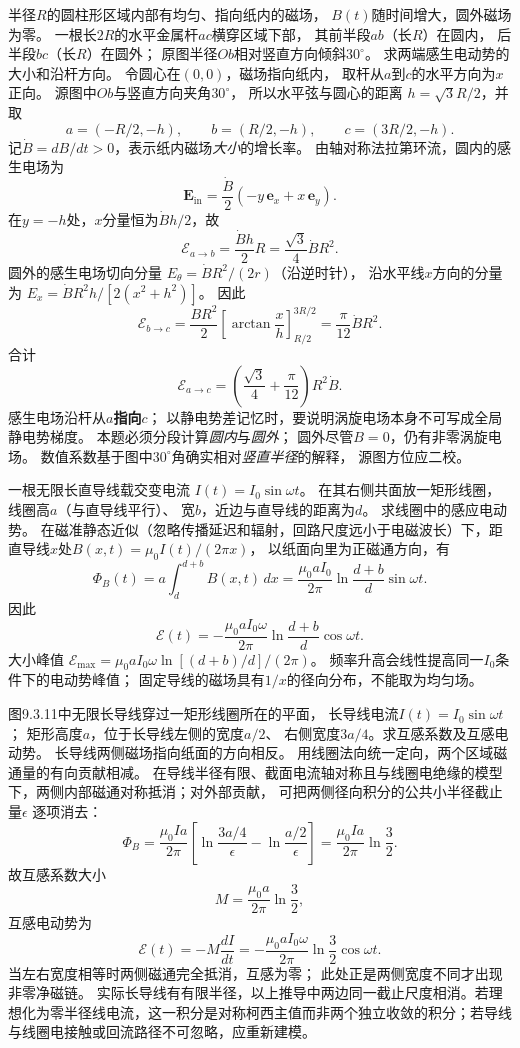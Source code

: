 \problemtext 半径$R$的圆柱形区域内部有均匀、指向纸内的磁场，
$B(t)$随时间增大，圆外磁场为零。
一根长$2R$的水平金属杆$ac$横穿区域下部，
其前半段$ab$（长$R$）在圆内，
后半段$bc$（长$R$）在圆外；
原图半径$Ob$相对竖直方向倾斜$30^\circ$。
求两端感生电动势的大小和沿杆方向。
\workings
令圆心在$(0,0)$，磁场指向纸内，
取杆从$a$到$c$的水平方向为$x$正向。
源图中$Ob$与竖直方向夹角$30^\circ$，
所以水平弦与圆心的距离
$h=\sqrt3R/2$，并取
\[
a=(-R/2,-h),\qquad b=(R/2,-h),\qquad c=(3R/2,-h).
\]
记$\dot B=dB/dt>0$，表示纸内磁场\emph{大小}的增长率。
由轴对称法拉第环流，圆内的感生电场为
\[
\bm E_{\mathrm{in}}
=\frac{\dot B}{2}(-y\,\bm e_x+x\,\bm e_y).
\]
在$y=-h$处，$x$分量恒为$\dot Bh/2$，故
\[
\mathcal E_{a\to b}
=\frac{\dot Bh}{2}R
=\frac{\sqrt3}{4}\dot BR^2.
\]
圆外的感生电场切向分量
$E_\theta=\dot BR^2/(2r)$（沿逆时针），
沿水平线$x$方向的分量为
$E_x=\dot BR^2h/[2(x^2+h^2)]$。
因此
\[
\mathcal E_{b\to c}
=\frac{\dot BR^2}{2}
\left[
\arctan\frac{x}{h}
\right]_{R/2}^{3R/2}
=\frac{\pi}{12}\dot BR^2.
\]
合计
\[
\boxed{\mathcal E_{a\to c}
=\left(\frac{\sqrt3}{4}+\frac{\pi}{12}\right)R^2\dot B}.
\]
感生电场沿杆从\textbf{$a$指向$c$}；
以静电势差记忆时，要说明涡旋电场本身不可写成全局静电势梯度。
\crosscheck 本题必须分段计算\emph{圆内}与\emph{圆外}；
圆外尽管$B=0$，仍有非零涡旋电场。
数值系数基于图中$30^\circ$角确实相对\emph{竖直半径}的解释，
源图方位应二校。

\problemtext 一根无限长直导线载交变电流
$I(t)=I_0\sin\omega t$。
在其右侧共面放一矩形线圈，线圈高$a$（与直导线平行）、
宽$b$，近边与直导线的距离为$d$。
求线圈中的感应电动势。
\workings
在磁准静态近似（忽略传播延迟和辐射，回路尺度远小于电磁波长）下，距直导线$x$处$B(x,t)=\mu_0I(t)/(2\pi x)$，
以纸面向里为正磁通方向，有
\[
\Phi_B(t)=a\int_d^{d+b}B(x,t)\,dx
=\frac{\mu_0aI_0}{2\pi}
\ln\frac{d+b}{d}\sin\omega t.
\]
因此
\[
\boxed{\mathcal E(t)=
-\frac{\mu_0aI_0\omega}{2\pi}
\ln\frac{d+b}{d}\cos\omega t}.
\]
大小峰值
$\boxed{\mathcal E_{\max}
=\mu_0aI_0\omega\ln[(d+b)/d]/(2\pi)}$。
\crosscheck 频率升高会线性提高同一$I_0$条件下的电动势峰值；
固定导线的磁场具有$1/x$的径向分布，不能取为均匀场。

\problemtext 图9.3.11中无限长导线穿过一矩形线圈所在的平面，
长导线电流$I(t)=I_0\sin\omega t$；
矩形高度$a$，位于长导线左侧的宽度$a/2$、
右侧宽度$3a/4$。求互感系数及互感电动势。
\workings
长导线两侧磁场指向纸面的方向相反。
用线圈法向统一定向，两个区域磁通量的有向贡献相减。
在导线半径有限、截面电流轴对称且与线圈电绝缘的模型下，两侧内部磁通对称抵消；对外部贡献，
可把两侧径向积分的公共小半径截止量$\epsilon$
逐项消去：
\[
\Phi_B=\frac{\mu_0Ia}{2\pi}
\left[
\ln\frac{3a/4}{\epsilon}
-\ln\frac{a/2}{\epsilon}
\right]
=\frac{\mu_0Ia}{2\pi}\ln\frac32.
\]
故互感系数大小
\[
\boxed{M=\frac{\mu_0a}{2\pi}\ln\frac32},
\]
互感电动势为
\[
\boxed{\mathcal E(t)=-M\frac{dI}{dt}
=-\frac{\mu_0aI_0\omega}{2\pi}
\ln\frac32\cos\omega t}.
\]
\crosscheck 当左右宽度相等时两侧磁通完全抵消，互感为零；
此处正是两侧宽度不同才出现非零净磁链。
实际长导线有有限半径，以上推导中两边同一截止尺度相消。若理想化为零半径线电流，这一积分是对称柯西主值而非两个独立收敛的积分；若导线与线圈电接触或回流路径不可忽略，应重新建模。

